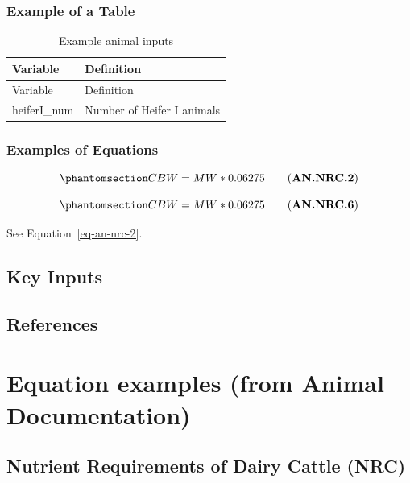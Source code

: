 \documentclass[
  letterpaper,
  oneside,
  openany]{scrbook}
\begin{document}
\subsection{Example of a Table}\label{example-of-a-table}

\begin{longtable}[]{@{}ll@{}}
\caption{Example animal inputs}\label{tbl-animal-inputs}\tabularnewline
\toprule\noalign{}
Variable & Definition \\
\midrule\noalign{}
\endfirsthead
\toprule\noalign{}
Variable & Definition \\
\midrule\noalign{}
\endhead
\bottomrule\noalign{}
\endlastfoot
heiferI\_num & Number of Heifer I animals \\
\end{longtable}

\subsection{Examples of Equations}\label{examples-of-equations}

\begin{equation}\protect\phantomsection\label{eq-an-nrc-2}{
CBW = MW * 0.06275 \tag{\textbf{AN.NRC.2}}
}\end{equation}

\begin{equation}\protect\phantomsection\label{eq-an-nrc-6}{
CBW = MW * 0.06275 \tag{\textbf{AN.NRC.6}}
}\end{equation}

See Equation~\ref{eq-an-nrc-2}.

\section{Key Inputs}\label{key-inputs}

\section{References}\label{references}


\chapter{Equation examples (from Animal
Documentation)}\label{equation-examples-from-animal-documentation}

\section{Nutrient Requirements of Dairy Cattle (NRC)}\label{sec-nrc}
\end{document}
